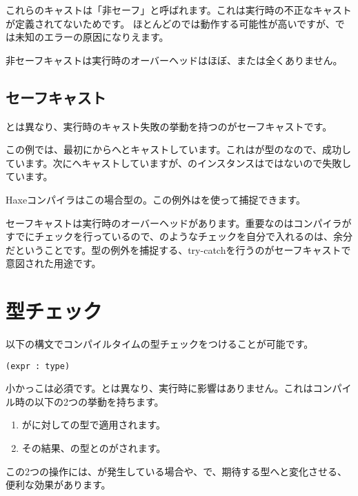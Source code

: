 これらのキャストは「非セーフ」と呼ばれます。これは実行時の不正なキャストが定義されてないためです。 ほとんどのでは動作する可能性が高いですが、では未知のエラーの原因になりえます。

非セーフキャストは実行時のオーバーヘッドはほぼ、または全くありません。

\subsection{セーフキャスト}
\label{expression-cast-safe}

とは異なり、実行時のキャスト失敗の挙動を持つのがセーフキャストです。


この例では、最初にからへとキャストしています。これはが型のなので、成功しています。次にへキャストしていますが、のインスタンスはではないので失敗しています。

Haxeコンパイラはこの場合型の。この例外はを使って捕捉できます。

セーフキャストは実行時のオーバーヘッドがあります。重要なのはコンパイラがすでにチェックを行っているので、のようなチェックを自分で入れるのは、余分だということです。型の例外を捕捉する、try-catchを行うのがセーフキャストで意図された用途です。

\section{型チェック}
\label{expression-type-check}

以下の構文でコンパイルタイムの型チェックをつけることが可能です。

\begin{lstlisting}
(expr : type)
\end{lstlisting}

小かっこは必須です。とは異なり、実行時に影響はありません。これはコンパイル時の以下の2つの挙動を持ちます。

\begin{enumerate}
\item {}がに対しての型で適用されます。
\item その結果、の型とのがされます。
\end{enumerate}

この2つの操作には、が発生している場合や、で、期待する型へと変化させる、便利な効果があります。
